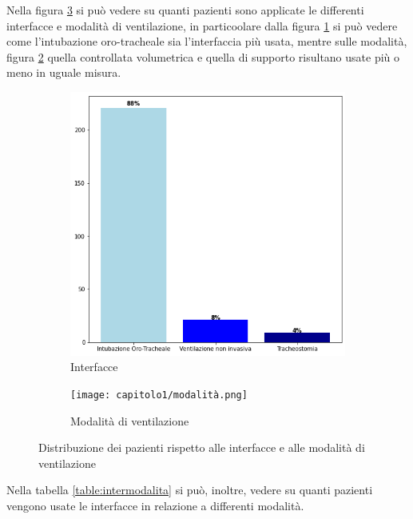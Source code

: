 Nella figura \ref{fig:intermod} si può vedere su quanti pazienti sono applicate le differenti  interfacce e modalità di ventilazione, in particoolare dalla figura \ref{fig:inter} si può vedere come l'intubazione oro-tracheale sia l'interfaccia più usata, mentre sulle modalità, figura \ref{fig:moda} quella controllata volumetrica e quella di supporto risultano usate più o meno in uguale misura.
\begin{figure}[h]
	\begin{subfigure}{.5\textwidth}
		\centering
		\includegraphics[width=.7\linewidth]{capitolo1/interfaccia.png}
		\caption{Interfacce}
		\label{fig:inter}
	\end{subfigure}%
	\begin{subfigure}{.5\textwidth}
		\centering
		\texttt{[image: capitolo1/modalità.png]}
		\caption{Modalità di ventilazione}
		\label{fig:moda}
	\end{subfigure}
	\caption{Distribuzione dei pazienti rispetto alle interfacce e alle modalità di ventilazione}
	\label{fig:intermod}
\end{figure}

Nella tabella \ref{table:intermodalita} si può, inoltre, vedere su quanti pazienti vengono usate le interfacce in relazione a differenti modalità.

